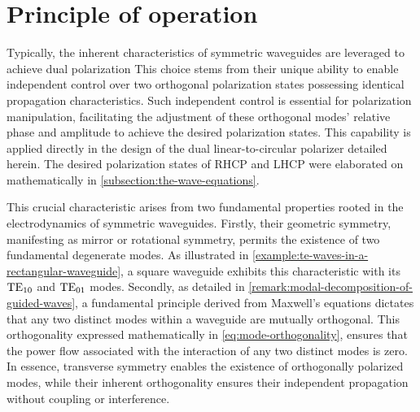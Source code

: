 \documentclass[11pt,a4paper,twoside,openany]{report}
\begin{document}
\section{Principle of operation}
Typically, the inherent characteristics of symmetric waveguides are leveraged to achieve dual polarization This choice stems from their unique ability to enable independent control over two orthogonal polarization states possessing identical propagation characteristics. Such independent control is essential for polarization manipulation, facilitating the adjustment of these orthogonal modes' relative phase and amplitude to achieve the desired polarization states. This capability is applied directly in the design of the dual linear-to-circular polarizer detailed herein. The desired polarization states of RHCP and LHCP were elaborated on mathematically in \cref{subsection:the-wave-equations}.

This crucial characteristic arises from two fundamental properties rooted in the electrodynamics of symmetric waveguides. Firstly, their geometric symmetry, manifesting as mirror or rotational symmetry, permits the existence of two fundamental degenerate modes. As illustrated in \cref{example:te-waves-in-a-rectangular-waveguide}, a square waveguide exhibits this characteristic with its $\text{TE}_{10}$ and $\text{TE}_{01}$ modes. Secondly, as detailed in \cref{remark:modal-decomposition-of-guided-waves}, a fundamental principle derived from Maxwell's equations dictates that any two distinct modes within a waveguide are mutually orthogonal. This orthogonality expressed mathematically in \cref{eq:mode-orthogonality}, ensures that the power flow associated with the interaction of any two distinct modes is zero. In essence, transverse symmetry enables the existence of orthogonally polarized modes, while their inherent orthogonality ensures their independent propagation without coupling or interference.
\end{document}
